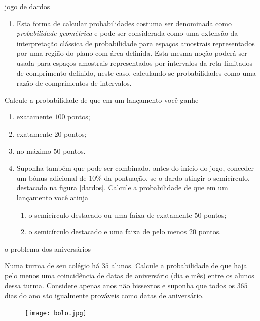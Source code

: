 \begin{task}{jogo de dardos}
\begin{enumerate}
\item {} 
Esta forma de calcular probabilidades costuma ser denominada como \textit{probabilidade geométrica} e pode ser considerada como uma extensão da interpretação clássica de probabilidade para espaços amostrais representados por uma região do plano com área definida. Esta mesma noção poderá ser usada para espaços amostrais representados por intervalos da reta limitados de comprimento definido, neste caso, calculando-se probabilidades como uma razão de comprimentos de intervalos.

\end{enumerate}

Calcule a probabilidade de que em um lançamento você ganhe
\begin{enumerate}
\item {} 
exatamente $100$ pontos;

\item {} 
exatamente $20$ pontos;

\item {} 
no máximo $50$ pontos.

\item {} 
Suponha também que pode ser combinado, antes do início do jogo, conceder um bônus adicional de $10\%$ da pontuação, se o dardo atingir o semicírculo, destacado na \hyperref[dardos]{figura \ref{dardos}}. Calcule a probabilidade de que em um lançamento você atinja
\begin{enumerate}
\item {} 
o semicírculo destacado ou uma faixa de exatamente 50 pontos;

\item {} 
o semicírculo destacado e uma faixa de pelo menos 20 pontos.

\end{enumerate}

\end{enumerate}
\end{task}

\begin{task}{o problema dos aniversários}


Numa turma de seu colégio há $35$ alunos. Calcule a probabilidade de que haja pelo menos uma coincidência de datas de aniversário (dia e mês) entre os alunos dessa turma. Considere apenas anos não bissextos e suponha que todos os $365$ dias do ano são igualmente prováveis como datas de aniversário.

\begin{figure}[H]
\centering

\noindent\texttt{[image: bolo.jpg]}
\end{figure}
\end{task}



